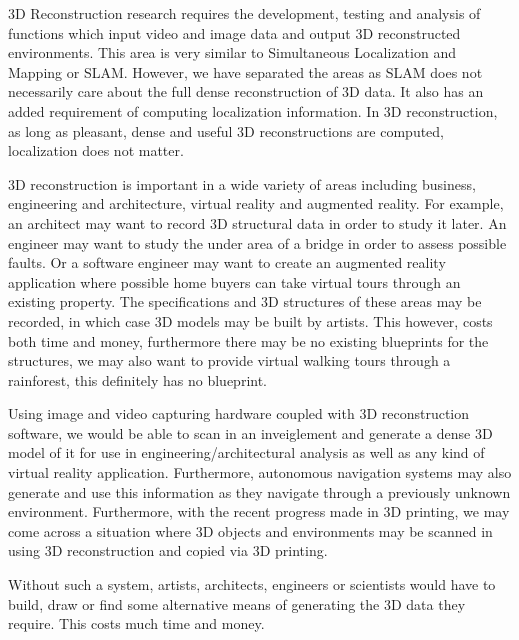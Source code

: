 3D Reconstruction research requires the development, testing and analysis of functions which input video and image data and output 3D reconstructed environments. This area is very similar to Simultaneous Localization and Mapping or SLAM. However, we have separated the areas as SLAM does not necessarily care about the full dense reconstruction of 3D data. It also has an added requirement of computing localization information. In 3D reconstruction, as long as pleasant, dense and useful 3D reconstructions are computed, localization does not matter.

3D reconstruction is important in a wide variety of areas including business, engineering and architecture, virtual reality and augmented reality. For example, an architect may want to record 3D structural data in order to study it later. An engineer may want to study the under area of a bridge in order to assess possible faults. Or a software engineer may want to create an augmented reality application where possible home buyers can take virtual tours through an existing property. The specifications and 3D structures of these areas may be recorded, in which case 3D models may be built by artists. This however, costs both time and money, furthermore there may be no existing blueprints for the structures, we may also want to provide virtual walking tours through a rainforest, this definitely has no blueprint.

Using image and video capturing hardware coupled with 3D reconstruction software, we would be able to scan in an inveiglement and generate a dense 3D model of it for use in engineering/architectural analysis as well as any kind of virtual reality application. Furthermore, autonomous navigation systems may also generate and use this information as they navigate through a previously unknown environment. Furthermore, with the recent progress made in 3D printing, we may come across a situation where 3D objects and environments may be scanned in using 3D reconstruction and copied via 3D printing.


Without such a system, artists, architects, engineers or scientists would have to build, draw or find some alternative means of generating the 3D data they require. This costs much time and money.

